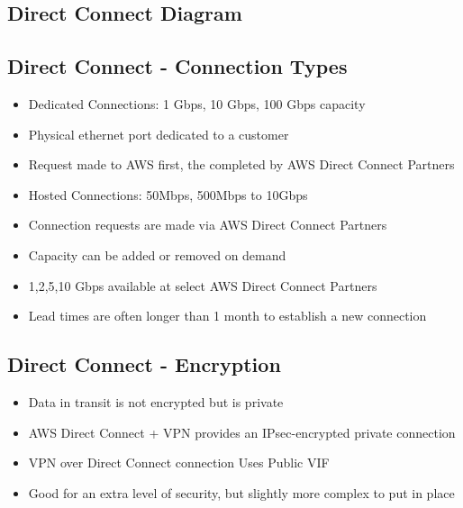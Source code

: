 \subsection{Direct Connect Diagram}

\subsection{Direct Connect - Connection Types}
\begin{itemize}
    \item Dedicated Connections: 1 Gbps, 10 Gbps, 100 Gbps capacity
    \item Physical ethernet port dedicated to a customer
    \item Request made to AWS first, the completed by AWS Direct Connect Partners
    \item Hosted Connections: 50Mbps, 500Mbps to 10Gbps
    \item Connection requests are made via AWS Direct Connect Partners
    \item Capacity can be added or removed on demand
    \item 1,2,5,10 Gbps available at select AWS Direct Connect Partners
    \item Lead times are often longer than 1 month to establish a new connection
\end{itemize}

\subsection{Direct Connect - Encryption}
\begin{itemize}
    \item Data in transit is not encrypted but is private
    \item AWS Direct Connect + VPN provides an IPsec-encrypted private connection
    \item VPN over Direct Connect connection Uses Public VIF
    \item Good for an extra level of security, but slightly more complex to put in place
\end{itemize}

